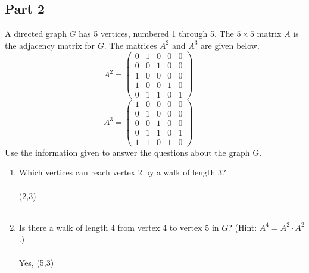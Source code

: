 \documentclass{amsart}
\theoremstyle{definition}
\theoremstyle{Exercise}
\theoremstyle{remark}
\theoremstyle{rule}
\numberwithin{equation}{section}
\begin{document}
\subsection*{Part 2}
A directed graph $G$ has 5 vertices, numbered 1 through 5. The $5\times 5$ matrix $A$ is the adjacency matrix for $G$. The matrices $A^2$ and $A^3$ are given below.
\[
A^2  = \left( \begin{array}{ccccc}
0 & 1 & 0 & 0 & 0 \\
0 & 0 & 1 & 0 & 0\\
1 & 0 & 0 & 0 & 0\\
1 & 0 & 0 & 1 & 0\\
0 & 1 & 1 & 0 & 1
\end{array} \right)~~~~~~~
\]
\[
A^3  = \left( \begin{array}{ccccc}
1 & 0 & 0 & 0 & 0 \\
0 & 1 & 0 & 0 & 0\\
0 & 0 & 1 & 0 & 0\\
0 & 1 & 1 & 0 & 1\\
1 & 1 & 0 & 1 & 0
\end{array} \right)~~~~~~~
\]
Use the information given to answer the questions about the graph G.
\begin{enumerate}[label=(\alph*)]
\item Which vertices can reach vertex 2 by a walk of length 3?\\\\
(2,3)
\\\\

\item Is there a walk of length 4 from vertex 4 to vertex 5 in $G$? (Hint: $A^4 = A^2\cdot A^2$.)\\\\
Yes, (5,3)\\
\end{enumerate}

 \newpage
\end{document}
